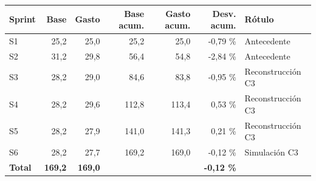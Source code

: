 \footnotesize
\begin{tabularx}{\linewidth}{l r r r r r X}
\toprule
\textbf{Sprint} & \textbf{Base} & \textbf{Gasto} & \textbf{Base acum.} & \textbf{Gasto acum.} & \textbf{Desv. acum.} & \textbf{Rótulo} \\
\midrule
S1 & 25,2 & 25,0 & 25,2 & 25,0 & -0,79 \% & Antecedente \\
S2 & 31,2 & 29,8 & 56,4 & 54,8 & -2,84 \% & Antecedente \\
S3 & 28,2 & 29,0 & 84,6 & 83,8 & -0,95 \% & Reconstrucción C3 \\
S4 & 28,2 & 29,6 & 112,8 & 113,4 & 0,53 \% & Reconstrucción C3 \\
S5 & 28,2 & 27,9 & 141,0 & 141,3 & 0,21 \% & Reconstrucción C3 \\
S6 & 28,2 & 27,7 & 169,2 & 169,0 & -0,12 \% & Simulación C3 \\
\textbf{Total} & \textbf{169,2} & \textbf{169,0} &  &  & \textbf{-0,12 \%} &  \\
\bottomrule
\end{tabularx}
